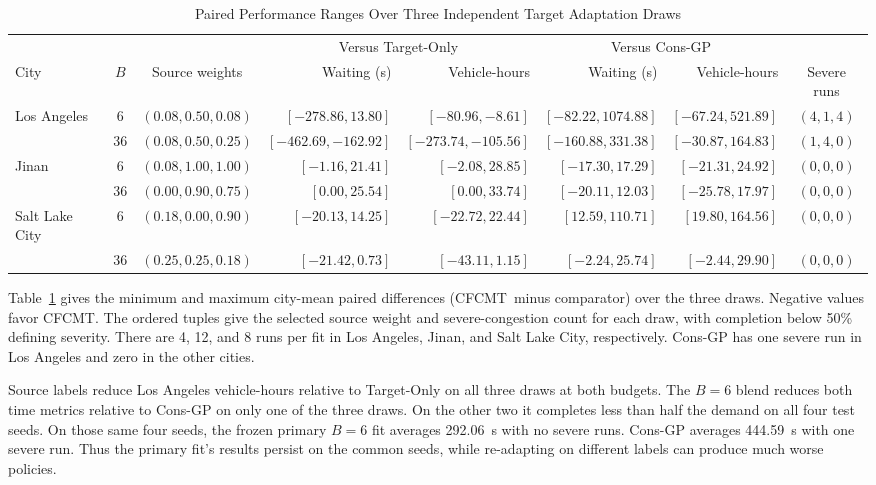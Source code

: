 \documentclass[letterpaper,journal]{IEEEtran}
\newcommand{\method}{CFCMT}
\begin{document}
\begin{table}[!t]
\centering
\caption{Paired Performance Ranges Over Three Independent Target Adaptation Draws}
\label{tab:adaptation_repeats}
\footnotesize
\setlength{\tabcolsep}{5pt}
\begin{tabular}{@{}lccrrrrc@{}}
\toprule
 & & & \multicolumn{2}{c}{Versus Target-Only} & \multicolumn{2}{c}{Versus Cons-GP} & \\
\cmidrule(lr){4-5}\cmidrule(lr){6-7}
City & $B$ & Source weights & Waiting (s) & Vehicle-hours & Waiting (s) & Vehicle-hours & Severe runs\\
\midrule
Los Angeles & 6 & $(0.08, 0.50, 0.08)$ & $[-278.86, 13.80]$ & $[-80.96, -8.61]$ & $[-82.22, 1074.88]$ & $[-67.24, 521.89]$ & $(4, 1, 4)$ \\
 & 36 & $(0.08, 0.50, 0.25)$ & $[-462.69, -162.92]$ & $[-273.74, -105.56]$ & $[-160.88, 331.38]$ & $[-30.87, 164.83]$ & $(1, 4, 0)$ \\
Jinan & 6 & $(0.08, 1.00, 1.00)$ & $[-1.16, 21.41]$ & $[-2.08, 28.85]$ & $[-17.30, 17.29]$ & $[-21.31, 24.92]$ & $(0, 0, 0)$ \\
 & 36 & $(0.00, 0.90, 0.75)$ & $[0.00, 25.54]$ & $[0.00, 33.74]$ & $[-20.11, 12.03]$ & $[-25.78, 17.97]$ & $(0, 0, 0)$ \\
Salt Lake City & 6 & $(0.18, 0.00, 0.90)$ & $[-20.13, 14.25]$ & $[-22.72, 22.44]$ & $[12.59, 110.71]$ & $[19.80, 164.56]$ & $(0, 0, 0)$ \\
 & 36 & $(0.25, 0.25, 0.18)$ & $[-21.42, 0.73]$ & $[-43.11, 1.15]$ & $[-2.24, 25.74]$ & $[-2.44, 29.90]$ & $(0, 0, 0)$ \\
\bottomrule
\end{tabular}
\end{table}

Table~\ref{tab:adaptation_repeats} gives the minimum and maximum city-mean paired differences (\method\ minus comparator) over the three draws. Negative values favor \method. The ordered tuples give the selected source weight and severe-congestion count for each draw, with completion below 50\% defining severity. There are 4, 12, and 8 runs per fit in Los Angeles, Jinan, and Salt Lake City, respectively. Cons-GP has one severe run in Los Angeles and zero in the other cities.

Source labels reduce Los Angeles vehicle-hours relative to Target-Only on all three draws at both budgets. The $B=6$ blend reduces both time metrics relative to Cons-GP on only one of the three draws. On the other two it completes less than half the demand on all four test seeds. On those same four seeds, the frozen primary $B=6$ fit averages 292.06~s with no severe runs. Cons-GP averages 444.59~s with one severe run. Thus the primary fit's results persist on the common seeds, while re-adapting on different labels can produce much worse policies.
\end{document}
